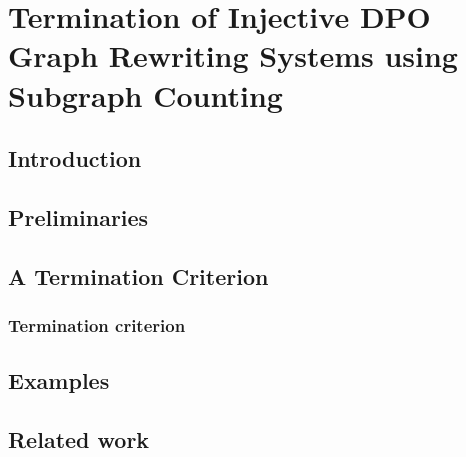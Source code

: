 \documentclass{report}
\begin{document}
\chapter{Termination of Injective DPO Graph Rewriting
Systems using Subgraph Counting}
\label{chap:subgraph_counting}
\section{Introduction}
\label{sec:intro}

\section{Preliminaries} 
\label{sec:pre} 
% 

% 

% 
   
\section{A Termination Criterion} 
\label{sec:termination_criterion}
 
 
\subsection{Termination criterion}
\label{sec:termination} 

 

\section{Examples}
\label{sec:examples}


  
\section{Related work}
\label{sec:related_work} 

\end{document}
